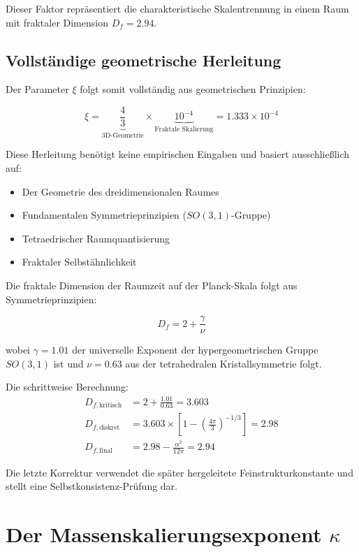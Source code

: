 \documentclass[12pt,a4paper]{article}
\theoremstyle{definition}
\begin{document}
Dieser Faktor repräsentiert die charakteristische Skalentrennung in einem Raum mit fraktaler Dimension $D_f = 2.94$.

\subsection{Vollständige geometrische Herleitung}

Der Parameter $\xi$ folgt somit vollständig aus geometrischen Prinzipien:

\begin{equation}
	\boxed{\xi = \underbrace{\frac{4}{3}}_{\text{3D-Geometrie}} \times \underbrace{10^{-4}}_{\text{Fraktale Skalierung}} = 1.333 \times 10^{-4}}
\end{equation}

Diese Herleitung benötigt keine empirischen Eingaben und basiert ausschließlich auf:
\begin{itemize}
	\item Der Geometrie des dreidimensionalen Raumes
	\item Fundamentalen Symmetrieprinzipien ($SO(3,1)$-Gruppe)
	\item Tetraedrischer Raumquantisierung
	\item Fraktaler Selbstähnlichkeit
\end{itemize}	
	Die fraktale Dimension der Raumzeit auf der Planck-Skala folgt aus Symmetrieprinzipien:
	
	\begin{equation}
		D_f = 2 + \frac{\gamma}{\nu}
	\end{equation}
	
	wobei $\gamma = 1.01$ der universelle Exponent der hypergeometrischen Gruppe $SO(3,1)$ ist und $\nu = 0.63$ aus der tetrahedralen Kristallsymmetrie folgt.
	
	Die schrittweise Berechnung:
	\begin{align}
		D_{f,\text{kritisch}} &= 2 + \frac{1.01}{0.63} = 3.603\\
		D_{f,\text{diskret}} &= 3.603 \times \left[1 - \left(\frac{4\pi}{3}\right)^{-1/3}\right] = 2.98\\
		D_{f,\text{final}} &= 2.98 - \frac{\alpha^2}{12\pi} = 2.94
	\end{align}
	
	Die letzte Korrektur verwendet die sp\"ater hergeleitete Feinstrukturkonstante und stellt eine Selbstkonsistenz-Pr\"ufung dar.
	
	\section{Der Massenskalierungsexponent $\kappa$}
	
\end{document}
